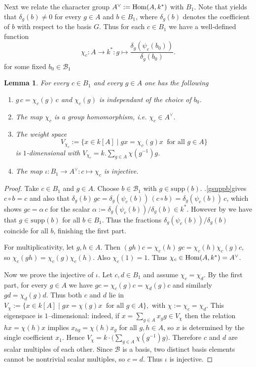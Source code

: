 \documentclass[a4paper,10pt]{amsart}
\newtheorem{lemma}{Lemma}[section]
\theoremstyle{definition}
\theoremstyle{remark}
\newcommand\Hom{{\rm Hom}}
\newcommand{\Supp}{\mathrm{supp}}
\newcommand\mc{\mathcal}
\begin{document}
Next we relate the character group $A^{\vee} := \Hom(A,k^*)$ with $B_1$. Note that  yields that $\delta_g(b)\neq 0$ for every $g\in A$ and $b \in B_1$, where $\delta_g(b)$ denotes the coefficient of $b$ with respect to the basis $G$. Thus for each $c\in B_1$ we have a well-defined function
\begin{equation}\label{eq:def-chi_c}
\chi_c:A\to k^\ast: g \mapsto \frac{\delta_g(\psi_c(b_0))}{\delta_g(b_0)}.
\end{equation}
for some fixed $b_0 \in \mc{B}_1$ 

\begin{lemma}\label{lem:gc-eigenvector}
For every $c\in B_1$ and every $g\in A$ one has the following
\begin{enumerate}
    \item\label{weight space}$ g\,c=\chi_c(g)\,c$ and $\chi_c(g)$ is independant of the choice of $b_0$.
    \item The map  $\chi_c$ is a group homomorphism, i.e. $\chi_c\in A^\vee$.
    \item The weight space
    $$
V_{\chi_c}:=\{x\in k[A]\mid gx=\chi_c(g)x\ \text{ for all } g\in A\}
$$
is $1$-dimensional with $V_{\chi_c} = k . \sum_{g\in A} \chi(g^{-1})g$.
\item The map $\iota: B_1\rightarrow A^\vee: c\mapsto \chi_c$ is injective.
\end{enumerate}
\end{lemma}

\begin{proof}
Take $c\in B_1$ and $g\in A$. Choose $b\in \mc B_1$ with $g\in\Supp(b)$. .\eqref{gsuppb}gives $c\circ b=c$ and also that $\delta_g(b)\,g c=\delta_g(\psi_c(b))\,(c\circ b)=\delta_g(\psi_c(b))\,c$, which shows $gc=\alpha\,c$ for the scalar $ \alpha:=\delta_g(\psi_c(b))/\delta_g(b)\in k^\ast$. However by  we have that $g \in \Supp(b)$ for all $b \in B_1$. Thus the fractions  $\delta_g(\psi_c(b))/\delta_g(b)$ coincide for all $b$, finishing the first part.\smallskip

For multiplicativity, let $g,h\in A$. Then
$(gh)c=\chi_c(h)\,gc=\chi_c(h)\chi_c(g)c,$ so $\chi_c(gh)=\chi_c(g)\chi_c(h)$. Also $\chi_c(1)=1$.
Thus $\chi_c\in \Hom(A,k^\ast)=A^\vee$.\smallskip

Now we prove the injective of $\iota$. Let $c,d\in B_1$ and assume $\chi_c=\chi_d$.
By the first part, for every $g\in A$ we have $gc=\chi_c(g)c=\chi_d(g)c$ 
and similarly $gd=\chi_d(g)d$.
Thus both $c$ and $d$ lie in $ V_{\chi}:=\{x\in k[A]\mid gx=\chi(g)x\ \text{ for all } g\in A\},
$
with $\chi:=\chi_c=\chi_d$.
This eigenspace is $1$--dimensional: indeed, if $x=\sum_{g\in A}x_g g\in V_\chi$ then the relation
$ h x=\chi(h) x$ implies $x_{hg}=\chi(h)x_g$ for all $g,h\in A$, so $x$ is determined by the single coefficient $x_1$.
Hence $V_\chi=k\cdot \Big(\sum_{g\in A}\chi(g^{-1})g\Big)$.
Therefore $c$ and $d$ are scalar multiples of each other.
Since $\mc{B}$ is a basis, two distinct basis elements cannot be nontrivial scalar multiples, so $c=d$.
Thus $\iota$ is injective.
\end{proof}
\end{document}
